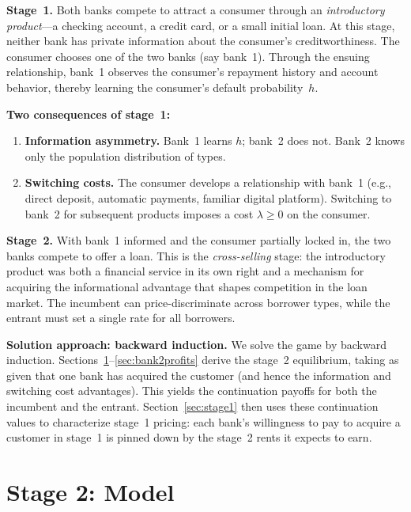 \documentclass[12pt]{article}
\theoremstyle{plain}
\theoremstyle{plain}
\theoremstyle{definition}  %
\theoremstyle{remark}  %
\begin{document}
\medskip\noindent
\textbf{Stage~1.} Both banks compete to attract a consumer through an \emph{introductory product}---a checking account, a credit card, or a small initial loan. At this stage, neither bank has private information about the consumer's creditworthiness. The consumer chooses one of the two banks (say bank~1). Through the ensuing relationship, bank~1 observes the consumer's repayment history and account behavior, thereby learning the consumer's default probability~$h$.

\medskip\noindent
\textbf{Two consequences of stage~1:}
\begin{enumerate}
    \item \textbf{Information asymmetry.} Bank~1 learns $h$; bank~2 does not. Bank~2 knows only the population distribution of types.
    \item \textbf{Switching costs.} The consumer develops a relationship with bank~1 (e.g., direct deposit, automatic payments, familiar digital platform). Switching to bank~2 for subsequent products imposes a cost $\lambda \geq 0$ on the consumer.
\end{enumerate}

\medskip\noindent
\textbf{Stage~2.} With bank~1 informed and the consumer partially locked in, the two banks compete to offer a loan. This is the \emph{cross-selling} stage: the introductory product was both a financial service in its own right and a mechanism for acquiring the informational advantage that shapes competition in the loan market. The incumbent can price-discriminate across borrower types, while the entrant must set a single rate for all borrowers.

\medskip\noindent
\textbf{Solution approach: backward induction.} We solve the game by backward induction. Sections~\ref{sec:model}--\ref{sec:bank2profits} derive the stage~2 equilibrium, taking as given that one bank has acquired the customer (and hence the information and switching cost advantages). This yields the continuation payoffs for both the incumbent and the entrant. Section~\ref{sec:stage1} then uses these continuation values to characterize stage~1 pricing: each bank's willingness to pay to acquire a customer in stage~1 is pinned down by the stage~2 rents it expects to earn.



\newpage
\section{Stage 2: Model}\label{sec:model}
\end{document}
